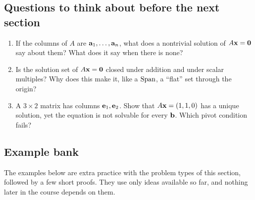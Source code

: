 \documentclass[11pt]{article}
\begin{document}
\subsection*{Questions to think about before the next section}
\begin{enumerate}
  \item If the columns of $A$ are $\mathbf{a}_1,\dots,\mathbf{a}_n$, what does a nontrivial solution of $A\mathbf{x}=\mathbf{0}$ say about them? What does it say when there is none?
  \item Is the solution set of $A\mathbf{x}=\mathbf{0}$ closed under addition and under scalar multiples? Why does this make it, like a $\operatorname{Span}$, a ``flat'' set through the origin?
  \item A $3\times2$ matrix has columns $\mathbf{e}_1,\mathbf{e}_2$. Show that $A\mathbf{x}=(1,1,0)$ has a unique solution, yet the equation is not solvable for every $\mathbf{b}$. Which pivot condition fails?
\end{enumerate}

\subsection*{Example bank}

The examples below are extra practice with the problem types of this section, followed by a few short proofs. They use only ideas available so far, and nothing later in the course depends on them.
\end{document}
